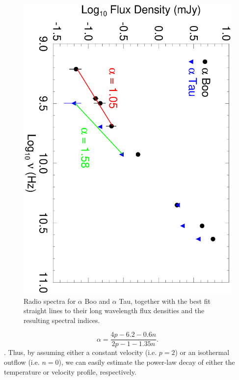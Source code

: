 \documentclass[iop]{emulateapj}
\begin{document}
\begin{figure}
\includegraphics[trim = 0mm 0mm 0mm 10mm, clip,scale=0.385,angle=90]{fig3.ps}
\caption{Radio spectra for $\alpha$ Boo and $\alpha$ Tau, together with the best fit straight lines to their long wavelength flux densities and the resulting spectral indices.}
\label{fig:fig3}
\end{figure}

\begin{equation}
\alpha = \frac{4p -6.2 -0.6n}{2p-1-1.35n}.
\label{eq:eq1}
\end{equation}
\citep[e.g.][]{1987ApJ...312..813S}. Thus, by assuming either a constant velocity (i.e. $p=2$) or an isothermal outflow (i.e. $n=0$), we can easily estimate the power-law decay of either the temperature or velocity profile, respectively. 
\end{document}
